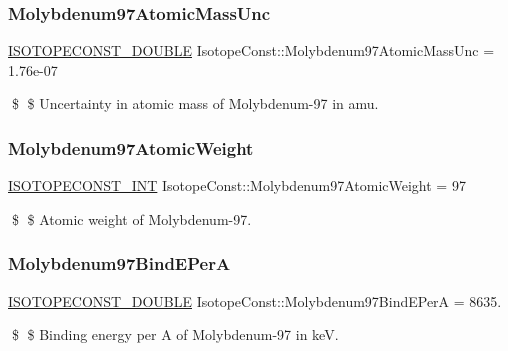 \subsubsection{\texorpdfstring{Molybdenum97\+Atomic\+Mass\+Unc}{Molybdenum97AtomicMassUnc}}
{\footnotesize\ttfamily \mbox{\hyperlink{group___isotope_const-_macros_ga8f45a7272ce02c0b4c65c44636ed719a}{I\+S\+O\+T\+O\+P\+E\+C\+O\+N\+S\+T\+\_\+\+D\+O\+U\+B\+LE}} Isotope\+Const\+::\+Molybdenum97\+Atomic\+Mass\+Unc = 1.\+76e-\/07}

\$ \$ Uncertainty in atomic mass of Molybdenum-\/97 in amu. \mbox{\label{group___isotope_const-_molybdenum-_mo97_ga28e3b011021233042806078fd25da700}} 
\subsubsection{\texorpdfstring{Molybdenum97\+Atomic\+Weight}{Molybdenum97AtomicWeight}}
{\footnotesize\ttfamily \mbox{\hyperlink{group___isotope_const-_macros_ga5f18360b3e99483a35c32d789e62621c}{I\+S\+O\+T\+O\+P\+E\+C\+O\+N\+S\+T\+\_\+\+I\+NT}} Isotope\+Const\+::\+Molybdenum97\+Atomic\+Weight = 97}

\$ \$ Atomic weight of Molybdenum-\/97. \mbox{\label{group___isotope_const-_molybdenum-_mo97_ga9e62f4d73768cb8c68e1abbffb0e9b11}} 
\subsubsection{\texorpdfstring{Molybdenum97\+Bind\+E\+PerA}{Molybdenum97BindEPerA}}
{\footnotesize\ttfamily \mbox{\hyperlink{group___isotope_const-_macros_ga8f45a7272ce02c0b4c65c44636ed719a}{I\+S\+O\+T\+O\+P\+E\+C\+O\+N\+S\+T\+\_\+\+D\+O\+U\+B\+LE}} Isotope\+Const\+::\+Molybdenum97\+Bind\+E\+PerA = 8635.}

\$ \$ Binding energy per A of Molybdenum-\/97 in keV. \mbox{\label{group___isotope_const-_molybdenum-_mo97_gaccb187e931632cf61d34bbdfd971112c}} 

